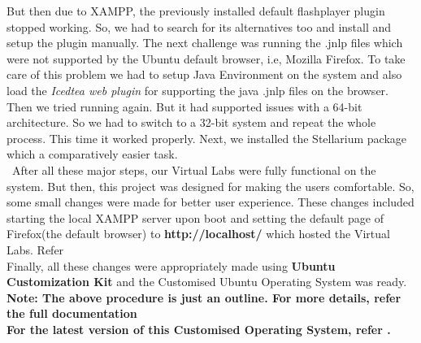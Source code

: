 \documentclass[conference]{IEEEtran}
\begin{document}
    But then due to XAMPP, the previously installed default flashplayer plugin stopped working. So, we had to search for its alternatives too and install and setup the plugin manually. The next challenge was running the .jnlp files which were not supported by the Ubuntu default browser, i.e, Mozilla Firefox. To take care of this problem we had to setup Java Environment on the system and also load the \textit{Icedtea web plugin} for supporting the java .jnlp files on the browser. Then we tried running again. But it had supported issues with a 64-bit architecture. So we had to switch to a 32-bit system and repeat the whole process. This time it worked properly. Next, we installed the Stellarium package which a comparatively easier task. \\\
    After all these major steps, our Virtual Labs were fully functional on the system. But then, this project was designed for making the users comfortable. So, some small changes were made for better user experience. These changes included starting the local XAMPP server upon boot and setting the default page of Firefox(the default browser) to \textbf{http://localhost/} which hosted the Virtual Labs. Refer \cite {MFH}\\
   Finally, all these changes were appropriately made using \textbf{Ubuntu Customization Kit} and the Customised Ubuntu Operating System was ready.\\
   \textbf{ Note: The above procedure is just an outline. For more details, refer the full documentation \cite {COSI}}\\
   \textbf{For the latest version of this Customised Operating System, refer \cite {COS}.}\\ 
\end{document}
